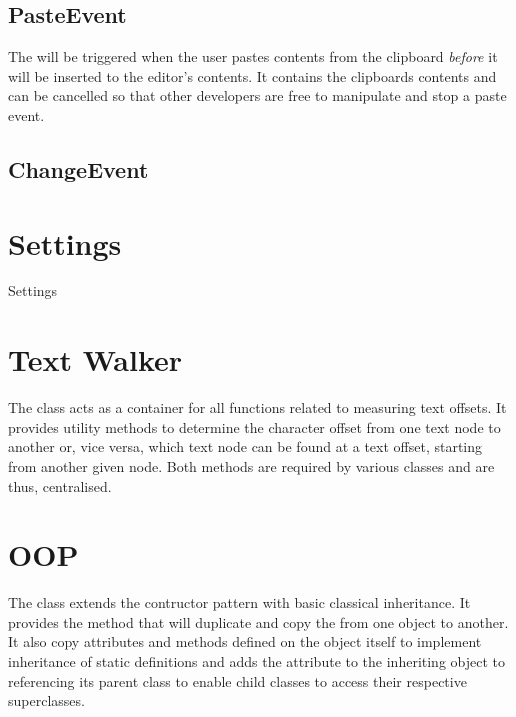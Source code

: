 \subsection{PasteEvent}
\label{subsec:paste_event}

The  will be triggered when the user pastes contents from the clipboard \textit{before} it will be inserted to the editor's contents. It contains the clipboards contents and can be cancelled so that other developers are free to manipulate and stop a paste event.

\subsection{ChangeEvent}
\label{subsec:change_event}



\section{Settings}

Settings

\section{Text Walker}

The  class acts as a container for all functions related to measuring text offsets. It provides utility methods to determine the character offset from one text node to another or, vice versa, which text node can be found at a text offset, starting from another given node. Both methods are required by various classes and are thus, centralised. 


\section{OOP}
\label{sec:oop_class}

The  class extends the contructor pattern with basic classical inheritance. It provides the method  that will duplicate and copy the  from one  object to another. It also copy attributes and methods defined on the  object itself to implement inheritance of static definitions and adds the attribute  to the inheriting  object to referencing its parent class to enable child classes to access their respective superclasses.

